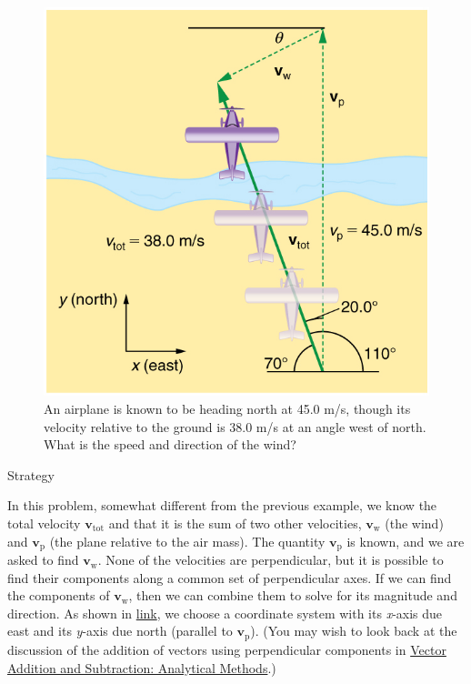 \documentclass[
]{book}
\newenvironment{tinysection}{}{}
\begin{document}
\begin{figure}
\hypertarget{import-auto-id1546060}{%
\centering
\includegraphics{images/Figure_03_05_04a.jpg}
\caption{An airplane is known to be heading north at 45.0 m/s, though its
velocity relative to the ground is 38.0 m/s at an angle west of north.
What is the speed and direction of the
wind?}\label{import-auto-id1546060}
}
\end{figure}

\begin{tinysection}

{Strategy}

\end{tinysection}

In this problem, somewhat different from the previous example, we know
the total velocity \(\textbf{v}_{\text{tot}}\) and that it is the sum of
two other velocities, \(\textbf{v}_{\text{w}}{}\) (the wind) and
\(\textbf{v}_{\text{p}}{}\) (the plane relative to the air mass). The
quantity \(\textbf{v}_{\text{p}}{}\) is known, and we are asked to find
\(\textbf{v}_{\text{w}}{}\). None of the velocities are perpendicular, but
it is possible to find their components along a common set of
perpendicular axes. If we can find the components of
\(\textbf{v}_{\text{w}}{}\), then we can combine them to solve for its
magnitude and direction. As shown in
\protect\hyperlink{import-auto-id1546060}{link}, we choose a
coordinate system with its \emph{x}-axis due east and its \emph{y}-axis due north
(parallel to \(\textbf{v}_{\text{p}}{}\)). (You may wish to look back at
the discussion of the addition of vectors using perpendicular components
in \href{/m54783}{Vector Addition and Subtraction: Analytical Methods}.)
\end{document}
